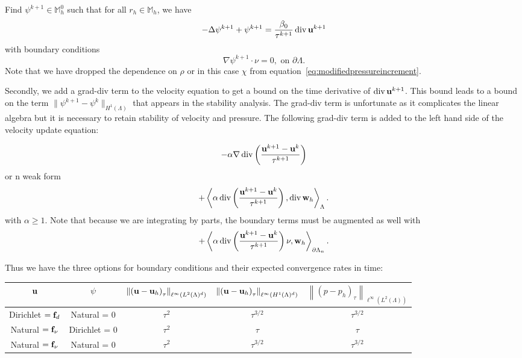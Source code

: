 \documentclass[letterpaper]{erdc}
\begin{document}
Find $\psi^{k+1}\in \mathbb{M}_h^0$ such that for all $r_h\in \mathbb{M}_h$, we
have
\begin{equation}\label{eq:modifiedpressureincrement}
  -\Delta\psi^{k+1} + \psi^{k+1} = \frac{\beta_0}{\tau^{k+1}}\operatorname{div}\textbf{u}^{k+1}
\end{equation}
with boundary conditions
\begin{equation}
  \nabla\psi^{k+1} \cdot \nu = 0, \mbox{ on } \partial\Lambda.
\end{equation}
Note that we have dropped the dependence on $\rho$ or in this case $\chi$ from
equation~\ref{eq:modifiedpressureincrement}.

Secondly, we add a grad-div term to the velocity equation to get a bound on the
time derivative of $\operatorname{div}\textbf{u}^{k+1}$.  This bound leads to a bound on the
term $\|\psi^{k+1}-\psi^{k}\|_{H^1(\Lambda)}$ that appears in the stability
analysis.  The grad-div term is unfortunate as it complicates the linear
algebra but it is necessary to retain stability of velocity and pressure.  The
following grad-div term is added to the left hand side of the velocity update
equation:

\begin{equation}
  -\alpha \nabla \operatorname{div}\left(\frac{\textbf{u}^{k+1} - \textbf{u}^{k}}{\tau^{k+1}}  \right)
\end{equation}
or n weak form
\begin{equation}
  + \left\langle \alpha \operatorname{div}\left(\frac{\textbf{u}^{k+1} - \textbf{u}^{k}}{\tau^{k+1}}  \right), \operatorname{div} \textbf{w}_h \right\rangle_{\Lambda}.
\end{equation}
with $\alpha\geq 1$. Note that because we are integrating by parts, the boundary terms must be augmented as well with
\begin{equation}
 + \left\langle \alpha \operatorname{div} \left(\frac{\textbf{u}^{k+1}-\textbf{u}^{k}}{\tau^{k+1}} \right)\nu , \textbf{w}_h \right\rangle_{\partial\Lambda_n}.
\end{equation}


Thus we have the three options for boundary conditions and their expected
convergence rates in time:

{\footnotesize
\noindent\begin{tabular}{|c|c|c|c|c|}
	\hline
	$\textbf{u}$ & $\psi$ & $\left\|\left(\textbf{u}-\textbf{u}_h\right)_{\tau}\right\|_{\ell^{\infty}(L^2(\Lambda)^d)}$ & $\left\|\left(\textbf{u}-\textbf{u}_h\right)_{\tau}\right\|_{\ell^{\infty}(H^1(\Lambda)^d)}$ & $\left\|\left(p-p_h\right)_{\tau}\right\|_{\ell^{\infty}(L^2(\Lambda))}$  \\
	\hline
	Dirichlet $=\mathbf{f}_d$ & Natural = 0 & $\tau^{2}$ & $\tau^{3/2}$ & $\tau^{3/2}$ \\
	\hline
	Natural $=\mathbf{f}_\nu$ & Dirichlet = 0 & $\tau^{2}$ & $\tau$ & $\tau$\\
	\hline
	Natural $=\mathbf{f}_{\nu}$ & Natural = 0 & $\tau^{2}$ & $\tau^{3/2}$ & $\tau^{3/2}$ \\
	\hline
\end{tabular}
}
\end{document}
